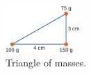 \documentclass{article}
\begin{document}
\begin{figure}
\centering
\includegraphics[width=0.25\textwidth]{figures/triangle.jpeg}
\caption{\label{fig:1} Triangle of masses.}
\end{figure}
\end{document}
